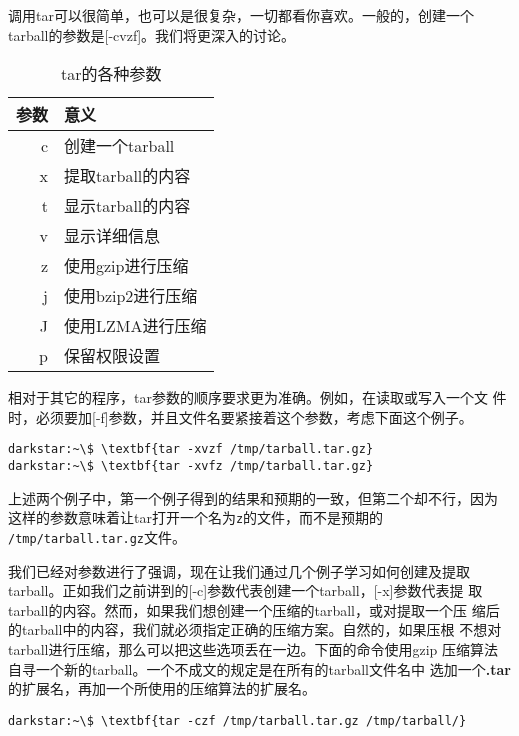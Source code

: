 调用tar可以很简单，也可以是很复杂，一切都看你喜欢。一般的，创建一个
tarball的参数是[-cvzf]。我们将更深入的讨论。
\begin{table}[htpb]
  \centering
\begin{tabular}{r|l}
\hline\hline
参数 & 意义 \\ \hline
c & 创建一个tarball \\
x & 提取tarball的内容 \\
t & 显示tarball的内容 \\
v & 显示详细信息 \\
z & 使用gzip进行压缩 \\
j & 使用bzip2进行压缩 \\
J & 使用LZMA进行压缩 \\
p & 保留权限设置 \\
\hline\hline
\end{tabular}
  \caption{tar的各种参数}
  \label{tab:tarArguments}
\end{table}

\begin{comment}
#+ORGTBL: send tarArguments orgtbl-to-latex 
|------+-------------------|
| 参数 | 意义              |
|------+-------------------|
| c    | 创建一个tarball   |
| x    | 提取tarball的内容 |
| t    | 显示tarball的内容 |
| v    | 显示详细信息      |
| z    | 使用gzip进行压缩  |
| j    | 使用bzip2进行压缩 |
| J    | 使用LZMA进行压缩  |
| p    | 保留权限设置      |
|------+-------------------|
\end{comment}

相对于其它的程序，tar参数的顺序要求更为准确。例如，在读取或写入一个文
件时，必须要加[-f]参数，并且文件名要紧接着这个参数，考虑下面这个例子。
\begin{Verbatim}[frame=single, commandchars=\\\{\}]
darkstar:~\$ \textbf{tar -xvzf /tmp/tarball.tar.gz}
darkstar:~\$ \textbf{tar -xvfz /tmp/tarball.tar.gz}
\end{Verbatim}

上述两个例子中，第一个例子得到的结果和预期的一致，但第二个却不行，因为
这样的参数意味着让tar打开一个名为\texttt{z}的文件，而不是预期的
\texttt{/tmp/tarball.tar.gz}文件。

我们已经对参数进行了强调，现在让我们通过几个例子学习如何创建及提取
tarball。正如我们之前讲到的[-c]参数代表创建一个tarball，[-x]参数代表提
取tarball的内容。然而，如果我们想创建一个压缩的tarball，或对提取一个压
缩后的tarball中的内容，我们就必须指定正确的压缩方案。自然的，如果压根
不想对tarball进行压缩，那么可以把这些选项丢在一边。下面的命令使用gzip
压缩算法自寻一个新的tarball。一个不成文的规定是在所有的tarball文件名中
选加一个\textbf{.tar}的扩展名，再加一个所使用的压缩算法的扩展名。
\begin{Verbatim}[frame=single, commandchars=\\\{\}]
darkstar:~\$ \textbf{tar -czf /tmp/tarball.tar.gz /tmp/tarball/}
\end{Verbatim}

